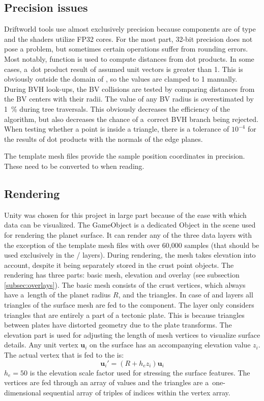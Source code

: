 \subsection{Precision issues}
Driftworld tools use almost exclusively  precision because  components are of  type and the shaders utilize FP32 cores. For the most part, 32-bit precision does not pose a problem, but sometimes certain operations suffer from rounding errors. Most notably,  function is used to compute distances from dot products. In some cases, a~dot product result of assumed unit vectors is greater than 1. This is obviously outside the domain of , so the values are clamped to 1 manually. During BVH look-ups, the BV collisions are tested by comparing distances from the BV centers with their radii. The value of any BV radius is overestimated by 1~\% during tree traversals. This obviously decreases the efficiency of the algorithm, but also decreases the chance of a~correct BVH branch being rejected. When testing whether a point is inside a triangle, there is a tolerance of $10^{-4}$ for the results of dot products with the normals of the edge planes.

The template mesh files provide the sample position coordinates in  precision. These need to be converted to  when reading.
\subsection{Rendering}
\label{subsec:rendering}
Unity was chosen for this project in large part because of the ease with which data can be visualized. The  GameObject is a dedicated Object in the scene used for rendering the planet surface. It can render any of the three data layers with the exception of the template mesh files with over 60,000 samples (that should be used exclusively in the / layers). During rendering, the mesh takes elevation into account, despite it being separately stored in the crust point objects. The rendering has three parts: basic mesh, elevation and overlay (see subsection \ref{subsec:overlays}). The basic mesh consists of the crust vertices, which always have a~length of the planet radius $R$, and the triangles. In case of  and  layers all triangles of the surface mesh are fed to the  component. The  layer only considers triangles that are entirely a part of a tectonic plate. This is because triangles between plates have distorted geometry due to the plate transforms. The elevation part is used for adjusting the length of mesh vertices to visualize surface details. Any unit vertex $\mathbf{u}_i$ on the surface has an accompanying elevation value $z_i$. The actual vertex that is fed to the  is:
$$\mathbf{u}_i'=(R+h_ez_i)\mathbf{u}_i$$
$h_e=50$ is the elevation scale factor used for stressing the surface features. The vertices are fed through an array of  values and the triangles are a~one-dimensional sequential array of triples of indices within the vertex array.

